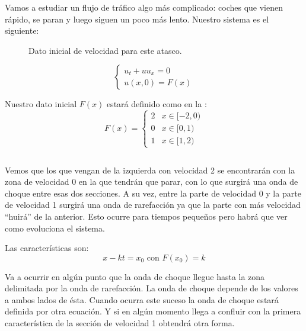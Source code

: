 		\begin{example} $ $ %

			Vamos a estudiar un flujo de tráfico algo más complicado: coches que vienen rápido, se paran y luego siguen un poco más lento. Nuestro sistema es el siguiente:

			\begin{minipage}{\textwidth}
				\begin{wrapfigure}[8]{R}{0.4\textwidth}
					\centering
					\caption{Dato inicial de velocidad para este atasco.}
					\label{fig:FTresVelocidades}
				\end{wrapfigure}

				\[
					\begin{cases}
						u_t + u u_x = 0 \\
						u(x,0) = F(x)
					\end{cases}
				\]

				Nuestro dato inicial $F(x)$ estará definido como en la : \[
					F(x) = \begin{cases}
						2 & x ∈ [-2, 0) \\
						0 & x ∈ [0, 1) \\
						1 & x ∈ [1, 2)
					\end{cases}
				\]
			\end{minipage}

			$ $ %

			Vemos que los que vengan de la izquierda con velocidad 2 se encontrarán con la zona de velocidad 0 en la que tendrán que parar, con lo que surgirá una onda de choque entre esas dos secciones. A su vez, entre la parte de velocidad 0 y la parte de velocidad 1 surgirá una onda de rarefacción ya que la parte con más velocidad ``huirá'' de la anterior. Esto ocurre para tiempos pequeños pero habrá que ver como evoluciona el sistema.

			Las características son:
			\[ x - kt = x_0 \text{ con } F(x_0) = k \]

			Va a ocurrir en algún punto que la onda de choque llegue hasta la zona delimitada por la onda de rarefacción. La onda de choque depende de los valores a ambos lados de ésta. Cuando ocurra este suceso la onda de choque estará definida por otra ecuación. Y si en algún momento llega a confluir con la primera característica de la sección de velocidad 1 obtendrá otra forma.



\end{example}

